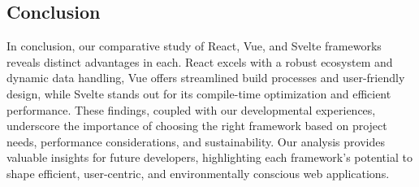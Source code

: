 \subsection*{Conclusion}

In conclusion, our comparative study of React, Vue, and Svelte frameworks reveals distinct advantages in each. React excels with a robust ecosystem and dynamic data handling, Vue offers streamlined build processes and user-friendly design, while Svelte stands out for its compile-time optimization and efficient performance. These findings, coupled with our developmental experiences, underscore the importance of choosing the right framework based on project needs, performance considerations, and sustainability. Our analysis provides valuable insights for future developers, highlighting each framework's potential to shape efficient, user-centric, and environmentally conscious web applications.
